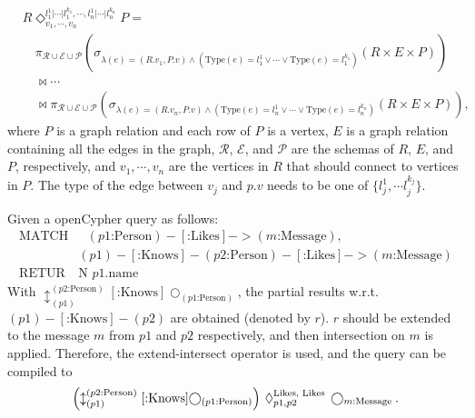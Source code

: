 \begin{equation}
    \begin{split}
        & R \Diamond^{l_1^{1}|\cdots|l_1^{k_1}, \cdots, l_n^{1}|\cdots|l_n^{k_n}}_{v_1, \cdots, v_n} P = \\ 
        & \hspace{1em} \pi_{\mathcal{R} \cup \mathcal{E} \cup \mathcal{P}}(\sigma_{\lambda(e) = (R.v_1, P.v) \land (\text{Type}(e) = l_1^1 \lor \cdots \lor \text{Type}(e) = l_1^{k_1})}(R \times E \times P)) \\
        & \hspace{1em} \Join \cdots \\
        & \hspace{1em} \Join \pi_{\mathcal{R} \cup \mathcal{E} \cup \mathcal{P}}(\sigma_{\lambda(e) = (R.v_n, P.v) \land (\text{Type}(e) = l_n^1 \lor \cdots \lor \text{Type}(e) = l_n^{k_n})}(R \times E \times P)),
    \end{split}
\end{equation}
where $P$ is a graph relation and each row of $P$ is a vertex,
$E$ is a graph relation containing all the edges in the graph, 
$\mathcal{R}$, $\mathcal{E}$, and $\mathcal{P}$ are the schemas of $R$, $E$, and $P$, respectively,
and $v_1, \cdots, v_n$ are the vertices in $R$ that should connect to vertices in $P$.
The type of the edge between $v_j$ and $p.v$ needs to be one of $\{l_j^1, \cdots l_j^{k_j}\}$.

Given a openCypher query as follows:
\begin{equation}
    \begin{split}
        \text{MATCH} & \text{ } (p1\text{:Person})-[\text{:Likes}]->(m\text{:Message}), \\
        & (p1)-[\text{:Knows}]-(p2\text{:Person})-[\text{:Likes}]->(m\text{:Message}) \\
        \text{RETUR}&\text{N } p1.\text{name}
    \end{split}
\end{equation}
With $\updownarrow^{(p2\text{:Person})}_{(p1)}[\text{:Knows}]\bigcirc_{(p1\text{:Person})}$, the partial results w.r.t.~$(p1)-[\text{:Knows}]-(p2)$ are obtained (denoted by $r$). 
$r$ should be extended to the message $m$ from $p1$ and $p2$ respectively, and then intersection on $m$ is applied.
Therefore, the extend-intersect operator is used, and the query can be compiled to
\begin{equation}
    \left(\updownarrow^{(p2\text{:Person})}_{(p1)}[\text{:Knows}]\bigcirc_{(p1\text{:Person})}\right) \hspace{0.2em} \Diamond_{p1, p2}^{\text{Likes, Likes}} \hspace{0.2em} \bigcirc_{m\text{:Message}}.
\end{equation}

